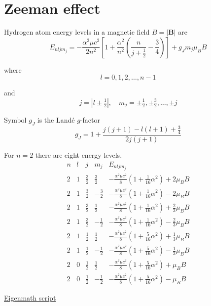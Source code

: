 

\section*{Zeeman effect}

Hydrogen atom energy levels in a magnetic field $B=|\mathbf B|$ are
\begin{equation*}
E_{nljm_j}=-\frac{\alpha^2\mu c^2}{2n^2}
\left[
1+\frac{\alpha^2}{n^2}\left(\frac{n}{j+\frac{1}{2}}-\frac{3}{4}\right)
\right]+g_Jm_j\mu_BB
\end{equation*}

where
\begin{equation*}
l=0,1,2,\ldots,n-1
\end{equation*}

and
\begin{equation*}
j=\left|l\pm\tfrac{1}{2}\right|,\quad
m_j=\pm\tfrac{1}{2},\pm\tfrac{3}{2},\ldots,\pm j
\end{equation*}

Symbol $g_J$ is the Land\'e $g$-factor
\begin{equation*}
g_J=1+\frac{j(j+1)-l(l+1)+\frac{3}{4}}{2j(j+1)}
\end{equation*}

For $n=2$ there are eight energy levels.
\begin{equation*}
\begin{matrix}
n & l & j & m_j & E_{nljm_j}
\\[1ex]
2 & 1 & \frac{3}{2} & \frac{3}{2} & -\frac{\alpha^2\mu c^2}{8}
(1+\tfrac{1}{16}\alpha^2)+2\mu_BB
\\[1ex]
2 & 1 & \frac{3}{2} & -\frac{3}{2} & -\frac{\alpha^2\mu c^2}{8}
(1+\tfrac{1}{16}\alpha^2)-2\mu_BB
\\[1ex]
2 & 1 & \frac{3}{2} & \frac{1}{2} & -\frac{\alpha^2\mu c^2}{8}
(1+\tfrac{1}{16}\alpha^2)+\frac{2}{3}\mu_BB
\\[1ex]
2 & 1 & \frac{3}{2} & -\frac{1}{2} & -\frac{\alpha^2\mu c^2}{8}
(1+\tfrac{1}{16}\alpha^2)-\frac{2}{3}\mu_BB
\\[1ex]
2 & 1 & \frac{1}{2} & \frac{1}{2} & -\frac{\alpha^2\mu c^2}{8}
(1+\tfrac{5}{16}\alpha^2)+\frac{1}{3}\mu_BB
\\[1ex]
2 & 1 & \frac{1}{2} & -\frac{1}{2} & -\frac{\alpha^2\mu c^2}{8}
(1+\tfrac{5}{16}\alpha^2)-\frac{1}{3}\mu_BB
\\[1ex]
2 & 0 & \frac{1}{2} & \frac{1}{2} & -\frac{\alpha^2\mu c^2}{8}
(1+\tfrac{5}{16}\alpha^2)+\mu_BB
\\[1ex]
2 & 0 & \frac{1}{2} & -\frac{1}{2} & -\frac{\alpha^2\mu c^2}{8}
(1+\tfrac{5}{16}\alpha^2)-\mu_BB
\end{matrix}
\end{equation*}

\href{https://georgeweigt.github.io/examples/zeeman-effect-demo.html}{Eigenmath script}


